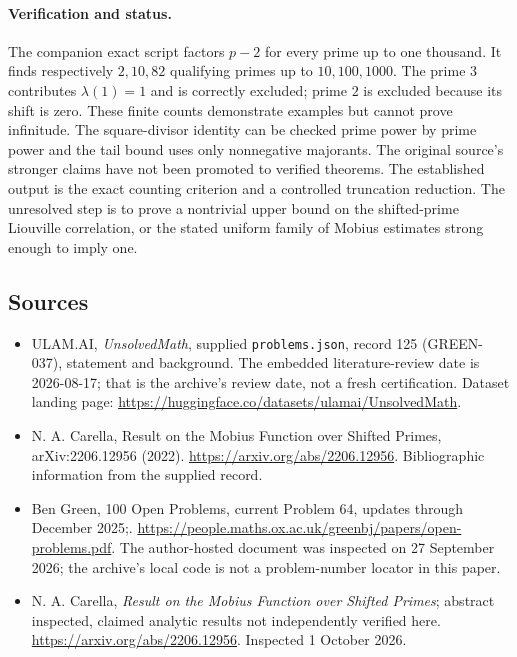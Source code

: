 \documentclass[11pt,a4paper]{article}
\begin{document}
\paragraph{Verification and status.}
The companion exact script factors $p-2$ for every prime up to one thousand. It finds respectively $2,10,82$ qualifying primes up to $10,100,1000$. The prime $3$ contributes $\lambda(1)=1$ and is correctly excluded; prime $2$ is excluded because its shift is zero. These finite counts demonstrate examples but cannot prove infinitude. The square-divisor identity can be checked prime power by prime power and the tail bound uses only nonnegative majorants. The original source's stronger claims have not been promoted to verified theorems. The established output is the exact counting criterion and a controlled truncation reduction. The unresolved step is to prove a nontrivial upper bound on the shifted-prime Liouville correlation, or the stated uniform family of Mobius estimates strong enough to imply one.

\subsection{Sources}

{\small

\begin{itemize}

\item[\hypertarget{source:125:1}{S1}] ULAM.AI, \emph{UnsolvedMath}, supplied \texttt{problems.json}, record 125 (GREEN-037), statement and background. The embedded literature-review date is 2026-08-17; that is the archive’s review date, not a fresh certification. Dataset landing page: \url{https://huggingface.co/datasets/ulamai/UnsolvedMath}.

\item[\hypertarget{source:125:2}{S2}] N. A. Carella, Result on the Mobius Function over Shifted Primes, arXiv:2206.12956 (2022). \url{https://arxiv.org/abs/2206.12956}. Bibliographic information from the supplied record.

\item[\hypertarget{source:125:3}{S3}] Ben Green, 100 Open Problems, current Problem 64, updates through December 2025;. \url{https://people.maths.ox.ac.uk/greenbj/papers/open-problems.pdf}. The author-hosted document was inspected on 27 September 2026; the archive’s local code is not a problem-number locator in this paper.

\item[E1] N. A. Carella, \emph{Result on the Mobius Function over Shifted Primes}; abstract inspected, claimed analytic results not independently verified here. \url{https://arxiv.org/abs/2206.12956}. Inspected 1 October 2026.

\end{itemize}

}

\label{end:125}
\end{document}

